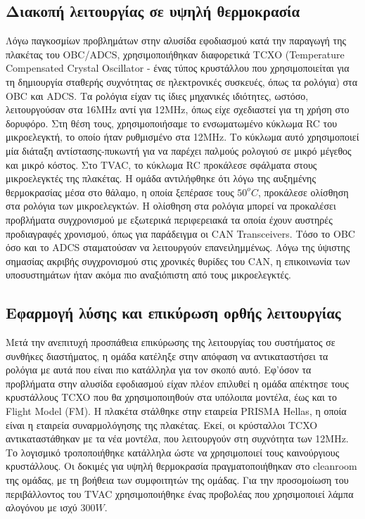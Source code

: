 \documentclass[a4paper,nobib,justified]{tufte-book}
\begin{document}
\subsection{Διακοπή λειτουργίας σε υψηλή θερμοκρασία}
Λόγω παγκοσμίων προβλημάτων στην αλυσίδα εφοδιασμού κατά την παραγωγή της πλακέτας του OBC/ADCS, χρησιμοποιήθηκαν διαφορετικά TCXO (Temperature Compensated Crystal Oscillator - ένας τύπος κρυστάλλου που χρησιμοποιείται για τη δημιουργία σταθερής συχνότητας σε ηλεκτρονικές συσκευές, όπως τα ρολόγια) στα OBC και ADCS. Τα ρολόγια είχαν τις ίδιες μηχανικές ιδιότητες, ωστόσο, λειτουργούσαν στα 16MHz αντί για 12MHz, όπως είχε σχεδιαστεί για τη χρήση στο δορυφόρο. Στη θέση τους, χρησιμοποιήσαμε το ενσωματωμένο κύκλωμα RC του μικροελεγκτή, το οποίο ήταν ρυθμισμένο στα 12MHz. Το κύκλωμα αυτό χρησιμοποιεί μία διάταξη αντίστασης-πυκωντή για να παρέχει παλμούς ρολογιού σε μικρό μέγεθος και μικρό κόστος. Στο TVAC, το κύκλωμα RC προκάλεσε σφάλματα στους μικροελεγκτές της πλακέτας. Η ομάδα αντιλήφθηκε ότι λόγω της αυξημένης θερμοκρασίας μέσα στο θάλαμο, η οποία ξεπέρασε τους $50^o C$, προκάλεσε ολίσθηση στα ρολόγια των μικροελεγκτών. Η ολίσθηση στα ρολόγια μπορεί να προκαλέσει προβλήματα συγχρονισμού με εξωτερικά περιφερειακά τα οποία έχουν αυστηρές προδιαγραφές χρονισμού, όπως για παράδειγμα οι CAN Transceivers. Τόσο το OBC όσο και το ADCS σταματούσαν να λειτουργούν επανειλημμένως. Λόγω της ύψιστης σημασίας ακριβής συγχρονισμού στις χρονικές θυρίδες του CAN, η επικοινωνία των υποσυστημάτων ήταν ακόμα πιο αναξιόπιστη από τους μικροελεγκτές.

\subsection{Εφαρμογή λύσης και επικύρωση ορθής λειτουργίας}
Μετά την ανεπιτυχή προσπάθεια επικύρωσης της λειτουργίας του συστήματος σε συνθήκες διαστήματος, η ομάδα κατέληξε στην απόφαση να αντικαταστήσει τα ρολόγια με αυτά που είναι πιο κατάλληλα για τον σκοπό αυτό. Εφ'όσον τα προβλήματα στην αλυσίδα εφοδιασμού είχαν πλέον επιλυθεί η ομάδα απέκτησε τους κρυστάλλους TCXO που θα χρησιμοποιηθούν στα υπόλοιπα μοντέλα, έως και το Flight Model (FM). Η πλακέτα στάλθηκε στην εταιρεία PRISMA Hellas, η οποία είναι η εταιρεία συναρμολόγησης της πλακέτας. Εκεί, οι κρύσταλλοι TCXO αντικαταστάθηκαν με τα νέα μοντέλα, που λειτουργούν στη συχνότητα των 12MHz. Το λογισμικό τροποποιήθηκε κατάλληλα ώστε να χρησιμοποιεί τους καινούργιους κρυστάλλους. Οι δοκιμές για υψηλή θερμοκρασία πραγματοποιήθηκαν στο cleanroom της ομάδας, με τη βοήθεια των συμφοιτητών της ομάδας. Για την προσομοίωση του περιβάλλοντος του TVAC χρησιμοποιήθηκε ένας προβολέας που χρησιμοποιεί λάμπα αλογόνου με ισχύ $300W$.
\end{document}
